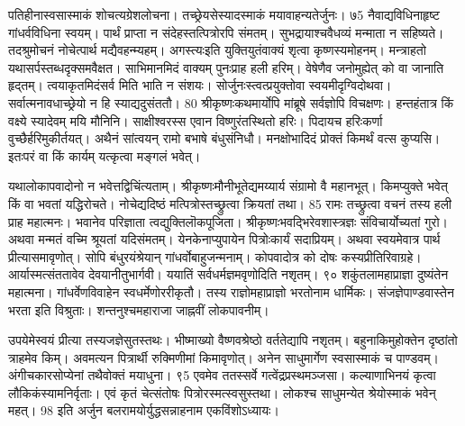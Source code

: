 पतिहीनास्वसास्माकं शोचत्यग्रेशलोचना।
 तच्छ्रेयसेस्यादस्माकं मयावाहन्यतेर्जुनः।
 ७5 नैवाद्यविधिनाहृष्ट गांधर्वविधिना स्वयम्।
 पार्थं प्राप्ता न संदेहस्तत्पित्रोरपि संमतम्।
 सुभद्रायाश्चवैधव्यं मन्माता न सहिष्यते।
 तदश्रुमोचनं नोचेत्पार्थ मद्यैवहन्म्यहम्।
 अगस्त्यःइति युक्तियुतंवाक्यं शृत्वा कृष्णस्यमोहनम्।
 मन्त्राहतो यथासर्पस्तब्धदृक्समवैक्षत।
 साभिमानमिदं वाक्यम् पुनःप्राह हली हरिम्।
 वेषेणैव जनोमुह्येत् को वा जानाति हृद्तम्।
 त्वयाकृतमिदंसर्व मिति भाति न संशयः।
 सोर्जुनःस्त्वत्प्रयुक्तोवा स्वयमीदृग्विदोथवा।
 सर्वात्मनावधाच्छ्रेयो न हि स्याद्यदुसंततौ।
 80 श्रीकृष्णःकथमार्योपि मांब्रूषे सर्वज्ञोपि विचक्षणः।
 हन्तहंतात्र किं वक्ष्ये स्यादेवम् मयि मौनिनि।
 साक्षीश्वरस्स एवान विष्णुरंतस्थितो हरिः।
 पिदायच हरिःकर्णा वुच्छैर्हरिमुकीर्तयत्।
 अथैनं सांत्वयन् रामो बभाषे बंधुसंनिधौ।
 मनक्षोभादिदं प्रोक्तं किमर्थं वत्स कुप्यसि।
 इतःपरं वा किं कार्यम् यत्कृत्वा मङ्गलं भवेत्।
 
यथालोकापवादोनो न भवेत्तद्विचिंत्यताम्।
 श्रीकृष्णःमौनीभूतेद्यमय्यार्य संग्रामो वै महानभूत्।
 किमप्युक्ते भवेत् किं वा भवतां यद्धिरोचते।
 नोचेद्यदिष्ठं मत्पित्रोस्तच्छ्रुत्वा क्रियतां तथा।
 85
रामः
तच्छ्रुत्वा वचनं तस्य हली प्राह महात्मनः।
 भवानेव परिज्ञाता त्वद्युक्तिलॊकपूजिता।
 श्रीकृष्णःभवद्भिरेवशास्त्रज्ञः संविचार्योच्यतां गुरो।
 अथवा मन्मतं वच्मि श्रूयतां यदिसंमतम्।
 येनकेनाप्युपायेन पित्रोःकार्यं सदाप्रियम्।
 अथवा स्वयमेवात्र पार्थ प्रीत्यासमावृणोत्।
 सोपि बंधुरयंश्रेयान् गांधर्वोबाहुजन्मनाम्।
 कोपवादोत्र को दोषः कस्यप्रीतिरिवाग्रहे।
 आर्यास्मत्संततावेव देवयानीतुभार्गवी।
 ययातिं सर्वधर्मज्ञमवृणोदिति नशृतम्।
 ९० शकुंतलामहाप्राज्ञा दुष्यंतेन महात्मना।
 गांधर्वेणविवाहेन स्वधर्मेणोररीकृतौ।
 तस्य राज्ञोमहाप्राज्ञो भरतोनाम धार्मिकः।
 संजज्ञेपाण्डवास्तेन भरता इति विश्रुताः।
 शन्तनुश्चमहाराजा जाह्नवीं लोकपावनीम्।
 
उपयेमेस्वयं प्रीत्या तस्यजज्ञेसुतस्तथः।
 भीष्माख्यो वैष्णवश्रेष्ठो वर्ततेद्यापि नशृतम्।
 बहुनाकिमुहोक्तेन दृष्ठांतो त्राहमेव किम्।
 अवमत्यन पित्रार्थी रुक्मिणीमां किमावृणोत्।
 अनेन साधुमार्गेण स्वसास्माकं च पाण्डवम्।
 अंगीचकारसोप्येनां तथैवोक्तं मयाधुना।
 ९5 एवमेव ततस्सर्वे गत्वेंद्रप्रस्थमञ्जसा।
 कल्याणाभिनयं कृत्वा लौकिकंस्यामनिर्वृताः।
 एवं कृतं चेत्संतोषः पित्रोरस्मत्स्वसुस्तथा।
 लोकश्च साधुमन्येत श्रेयोस्माकं भवेन् महत्।
 98 इति अर्जुन बलरामयोर्युद्धसन्नाहनाम
एकविंशोऽध्यायः।

